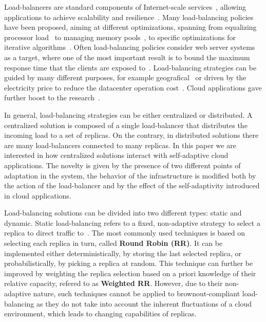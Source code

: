 Load-balancers are standard components of Internet-scale
services~\cite{WangOSDI}, allowing applications to achieve scalability
and resilience~\citep{Barroso09, Hamilton07:LISA,
  clusteredbalancing}. Many load-balancing policies have been
proposed, aiming at different optimizations, spanning from equalizing
processor load~\cite{Stankovic:TC} to managing memory
pools~\cite{PattersonMemoryLB,MemoryLBACC}, to specific optimizations
for iterative algorithms~\cite{BahiIterative}. Often load-balancing
policies consider web server systems~\cite{CLB,Cardellini2003} as a
target, where one of the most important result is to bound the maximum
response time that the clients are exposed
to~\cite{TC-Abdelzaher}. Load-balancing strategies can be guided by
many different purposes, for example
geografical~\cite{GeograficalSASO,geographicalwanbalancing} or driven
by the electricity price to reduce the datacenter operation 
cost~\cite{LoadBalancingForElectricity:TCC}. Cloud applications gave 
further boost to the research~\citep{Barroso09,Lu11:PerfEval,Lin12:IGCC}.

In general, load-balancing strategies can be either centralized or
distributed. A centralized solution is composed of a single
load-balancer that distributes the incoming load to a set of
replicas. On the contrary, in distributed solutions there are many
load-balancers connected to many replicas. In this paper we are
interested in how centralized solutions interact with self-adaptive
cloud applications. The novelty is given by the presence of two
different points of adaptation in the system, the behavior of the
infrastructure is modified both by the action of the load-balancer and
by the effect of the self-adaptivity introduced in cloud applications.

Load-balancing solutions can be divided into two different types:
static and dynamic. Static load-balancing refers to a fixed,
non-adaptive strategy to select a replica to direct traffic
to~\cite{StaticLoadBalancing:TSE,StaticOptimal:ACM}.  The most
commonly used techniques is based on selecting each replica in turn,
called \textbf{Round Robin (RR)}. It can be implemented either
deterministically, by storing the last selected replica, or
probabilistically, by picking a replica at random.  This technique can
further be improved by weighting the replica selection based on a
priori knowledge of their relative capacity, refered to as
\textbf{Weighted RR}.  However, due to their non-adaptive nature, such
techniques cannot be applied to brownout-compliant load-balancing as
they do not take into account the inherent fluctuations of a cloud
environment, which leads to changing capabilities of replicas.

